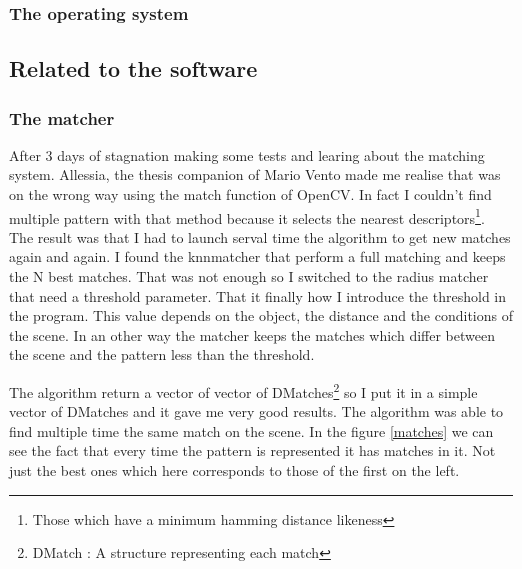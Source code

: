 	\subsubsection{The operating system}
	
	\subsection{Related to the software}
	
	\subsubsection{The matcher}
	
	\par After 3 days of stagnation making some tests and learing about the matching system. Allessia, the thesis companion of Mario Vento made me realise that was on the wrong way using the match function of OpenCV. In fact I couldn't find multiple pattern with that method because it selects the nearest descriptors\footnote{Those which have a minimum hamming distance likeness}. The result was that I had to launch serval time the algorithm to get new matches again and again. I found the knnmatcher that perform a full matching and keeps the N best matches. That was not enough so I switched to the radius matcher that need a threshold parameter. That it finally how I introduce the threshold in the program. This value depends on the object, the distance and the conditions of the scene. In an other way the matcher keeps the matches which differ between the scene and the pattern less than the threshold.
	\par The algorithm return a vector of vector of DMatches\footnote{DMatch : A structure representing each match} so I put it in a simple vector of DMatches and it gave me very good results. The algorithm was able to find multiple time the same match on the scene. In the figure \ref{matches} we can see the fact that every time the pattern is represented it has matches in it. Not just the best ones which here corresponds to those of the first on the left.
	
